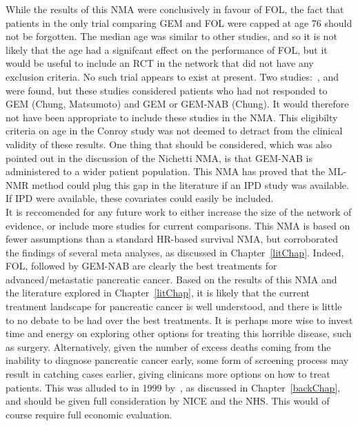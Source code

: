 While the results of this NMA were conclusively in favour of FOL, the fact that patients in the only trial comparing GEM and FOL were capped at age 76 should not be forgotten. The median age was similar to other studies, and so it is not likely that the age had a signifcant effect on the performance of FOL, but it would be useful to include an RCT in the network that did not have any exclusion criteria. No such trial appears to exist at present. Two studies:~\cite{matsumoto}, and~\cite{chung} were found, but these studies considered patients who had not responded to GEM (Chung, Matsumoto) and GEM or GEM-NAB (Chung). It would therefore not have been appropriate to include these studies in the NMA. This eligibilty criteria on age in the Conroy study was not deemed to detract from the clinical validity of these results. One thing that should be considered, which was also pointed out in the discussion of the Nichetti NMA, is that GEM-NAB is administered to a wider patient population. This NMA has proved that the ML-NMR method could plug this gap in the literature if an IPD study was available. If IPD were available, these covariates could easily be included. \\

It is reccomended for any future work to either increase the size of the network of evidence, or include more studies for current comparisons. This NMA is based on fewer assumptions than a standard HR-based survival NMA, but corroborated the findings of several meta analyses, as discussed in Chapter~\ref{litChap}. Indeed, FOL, followed by GEM-NAB are clearly the best treatments for advanced/metastatic pancreatic cancer. Based on the results of this NMA and the literature explored in Chapter~\ref{litChap}, it is likely that the current treatment landscape for pancreatic cancer is well understood, and there is little to no debate to be had over the best treatments. It is perhaps more wise to invest time and energy on exploring other options for treating this horrible disease, such as surgery. Alternatively, given the number of excess deaths coming from the inability to diagnose pancreatic cancer early, some form of screening process may result in catching cases earlier, giving clinicans more options on how to treat patients. This was alluded to in 1999 by~\cite{dimagno}, as discussed in Chapter~\ref{backChap}, and should be given full consideration by NICE and the NHS. This would of course require full economic evaluation. \\

